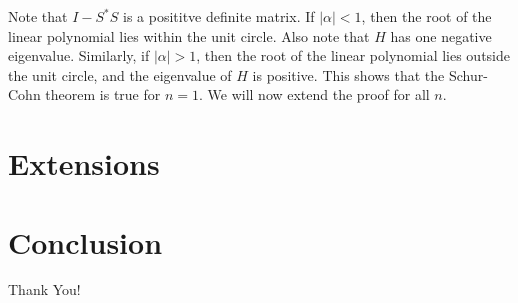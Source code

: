 \documentclass[twofold, twocolumn]{article}
\newcommand*\adj[1]{#1^*}
\newcommand*\abs[1]{\left \vert #1 \right\vert}
\theoremstyle{plain}
\theoremstyle{definition}
\begin{document}
Note that \(I - \adj{S} S\) is a posititve definite matrix. If \(\abs{\alpha} < 1\), then the root of the linear polynomial lies within the unit circle. Also note that \(H\) has one negative eigenvalue. Similarly, if \(\abs{\alpha} > 1\), then the root of the linear polynomial lies outside the unit circle, and the eigenvalue of \(H\) is positive. This shows that the Schur-Cohn theorem is true for \(n = 1\). We will now extend the proof for all \(n\). 
\section{Extensions}

\section{Conclusion}
Thank You!
\end{document}
